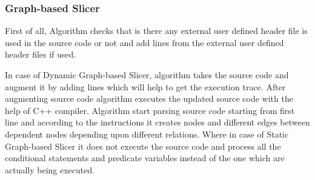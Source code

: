 \documentclass[conference]{IEEEtran}
\begin{document}
\subsubsection{Graph-based Slicer}
\par First of all, Algorithm checks that is there any external user defined header file is used in the source code or not and add lines from the external user defined header files if used. 
\par  In case of Dynamic Graph-based Slicer, algorithm takes the source code and augment it by adding lines which will help to get the execution trace. After augmenting source code algorithm executes the updated source code with the help of C++ compiler. Algorithm start parsing source code starting from first line and according to the instructions it creates nodes and different edges between dependent nodes depending upon different relations. Where in case of Static Graph-based Slicer it does not execute the source code and process all the conditional statements and predicate variables instead of the one which are actually being executed.
\end{document}
